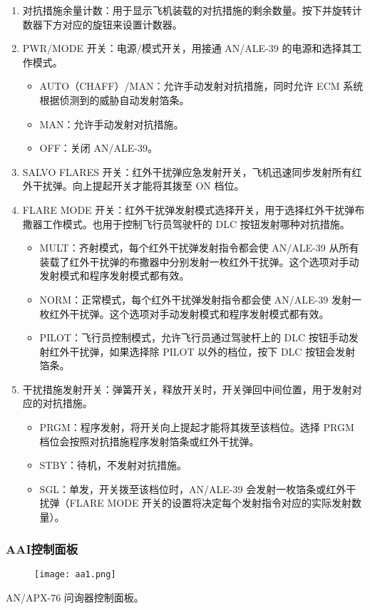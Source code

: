 \begin{enumerate}
	\item 对抗措施余量计数：用于显示飞机装载的对抗措施的剩余数量。按下并旋转计数器下方对应的旋钮来设置计数器。
	\item PWR/MODE 开关：电源/模式开关，用接通 AN/ALE-39 的电源和选择其工作模式。
	      \begin{itemize}
		      \item AUTO（CHAFF）/MAN：允许手动发射对抗措施，同时允许 ECM 系统根据侦测到的威胁自动发射箔条。
		      \item MAN：允许手动发射对抗措施。
		      \item OFF：关闭 AN/ALE-39。
	      \end{itemize}
	\item SALVO FLARES 开关：红外干扰弹应急发射开关，飞机迅速同步发射所有红外干扰弹。向上提起开关才能将其拨至 ON 档位。
	\item FLARE MODE 开关：红外干扰弹发射模式选择开关，用于选择红外干扰弹布撒器工作模式。也用于控制飞行员驾驶杆的 DLC 按钮发射哪种对抗措施。
	      \begin{itemize}
		      \item MULT：齐射模式，每个红外干扰弹发射指令都会使 AN/ALE-39 从所有装载了红外干扰弹的布撒器中分别发射一枚红外干扰弹。这个选项对手动发射模式和程序发射模式都有效。
		      \item NORM：正常模式，每个红外干扰弹发射指令都会使 AN/ALE-39 发射一枚红外干扰弹。这个选项对手动发射模式和程序发射模式都有效。
		      \item PILOT：飞行员控制模式，允许飞行员通过驾驶杆上的 DLC 按钮手动发射红外干扰弹，如果选择除 PILOT 以外的档位，按下 DLC 按钮会发射箔条。
	      \end{itemize}
	\item 干扰措施发射开关：弹簧开关，释放开关时，开关弹回中间位置，用于发射对应的对抗措施。
	      \begin{itemize}
		      \item PRGM：程序发射，将开关向上提起才能将其拨至该档位。选择 PRGM 档位会按照对抗措施程序发射箔条或红外干扰弹。
		      \item STBY：待机，不发射对抗措施。
		      \item SGL：单发，开关拨至该档位时，AN/ALE-39 会发射一枚箔条或红外干扰弹（FLARE MODE 开关的设置将决定每个发射指令对应的实际发射数量）。
	      \end{itemize}
\end{enumerate}

\subsubsection{AAI控制面板}
\begin{figure}[htb]
	\centering
	\texttt{[image: aa1.png]}
\end{figure}
AN/APX-76 问询器控制面板。

